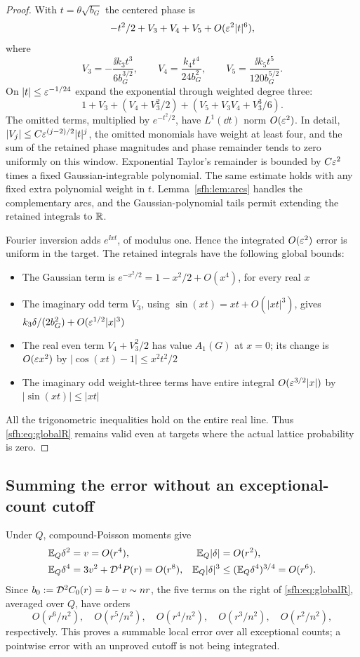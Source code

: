 \begin{proof}
With $t=\theta\sqrt{b_G}$ the centered phase is
\[
 -t^2/2+V_3+V_4+V_5+O(\varepsilon^2|t|^6),
\]
where
\[
 V_3=-\frac{\ii k_3t^3}{6b_G^{3/2}},\qquad
 V_4=\frac{k_4t^4}{24b_G^2},\qquad
 V_5=\frac{\ii k_5t^5}{120b_G^{5/2}}.
\]
On $|t|\le\varepsilon^{-1/24}$ expand the exponential through weighted degree three:
\begin{equation}\label{sfh:eq:weighted3}
 1+V_3+(V_4+V_3^2/2)+(V_5+V_3V_4+V_3^3/6).
\end{equation}
The omitted terms, multiplied by $e^{-t^2/2}$, have $L^1(\dd t)$ norm $O(\varepsilon^2)$. In detail, $|V_j|\le C\varepsilon^{(j-2)/2}|t|^j$, the omitted monomials have weight at least four, and the sum of the retained phase magnitudes and phase remainder tends to zero uniformly on this window. Exponential Taylor's remainder is bounded by $C\varepsilon^2$ times a fixed Gaussian-integrable polynomial. The same estimate holds with any fixed extra polynomial weight in $t$. Lemma~\ref{sfh:lem:arcs} handles the complementary arcs, and the Gaussian-polynomial tails permit extending the retained integrals to $\mathbb R$.

Fourier inversion adds $e^{\ii xt}$, of modulus one. Hence the integrated $O(\varepsilon^2)$ error is uniform in the target. The retained integrals have the following global bounds:
\begin{itemize}
\item The Gaussian term is $e^{-x^2/2}=1-x^2/2+O(x^4)$, for every real $x$
\item The imaginary odd term $V_3$, using $\sin(xt)=xt+O(|xt|^3)$, gives $k_3\delta/(2b_G^2)+O(\varepsilon^{1/2}|x|^3)$
\item The real even term $V_4+V_3^2/2$ has value $A_1(G)$ at $x=0$; its change is $O(\varepsilon x^2)$ by $|\cos(xt)-1|\le x^2t^2/2$
\item The imaginary odd weight-three terms have entire integral $O(\varepsilon^{3/2}|x|)$ by $|\sin(xt)|\le|xt|$
\end{itemize}
All the trigonometric inequalities hold on the entire real line. Thus \eqref{sfh:eq:globalR} remains valid even at targets where the actual lattice probability is zero.
\end{proof}

\subsection{Summing the error without an exceptional-count cutoff}
Under $Q$, compound-Poisson moments give
\begin{align*}
 \mathbb E_Q\delta^2&=v=O(r^4),& \mathbb E_Q|\delta|&=O(r^2),\\
 \mathbb E_Q\delta^4&=3v^2+\mathcal D^4P(r)=O(r^8),&
 \mathbb E_Q|\delta|^3&\le(\mathbb E_Q\delta^4)^{3/4}=O(r^6).
\end{align*}
Since $b_0:=\mathcal D^2C_0(r)=b-v\sim nr$, the five terms on the right of \eqref{sfh:eq:globalR}, averaged over $Q$, have orders
\begin{equation}\label{sfh:eq:fiveerrors}
 O(r^6/n^2),\quad O(r^5/n^2),\quad O(r^4/n^2),\quad
 O(r^3/n^2),\quad O(r^2/n^2),
\end{equation}
respectively. This proves a summable local error over all exceptional counts; a pointwise error with an unproved cutoff is not being integrated.

